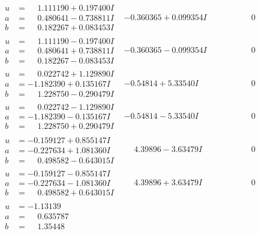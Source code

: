 \documentclass[1p]{elsarticle_modified}
\theoremstyle{definition}
\begin{document}
$$\begin{array}{c|c|c}
\begin{aligned}
u &= \phantom{-}1.111190 + 0.197400 I \\
a &= \phantom{-}0.480641 - 0.738811 I \\
b &= \phantom{-}0.182267 + 0.083453 I\end{aligned}
 & -0.360365 + 0.099354 I & \phantom{-0.000000 } 0 \\ \hline\begin{aligned}
u &= \phantom{-}1.111190 - 0.197400 I \\
a &= \phantom{-}0.480641 + 0.738811 I \\
b &= \phantom{-}0.182267 - 0.083453 I\end{aligned}
 & -0.360365 - 0.099354 I & \phantom{-0.000000 } 0 \\ \hline\begin{aligned}
u &= \phantom{-}0.022742 + 1.129890 I \\
a &= -1.182390 + 0.135167 I \\
b &= \phantom{-}1.228750 - 0.290479 I\end{aligned}
 & -0.54814 + 5.33540 I & \phantom{-0.000000 } 0 \\ \hline\begin{aligned}
u &= \phantom{-}0.022742 - 1.129890 I \\
a &= -1.182390 - 0.135167 I \\
b &= \phantom{-}1.228750 + 0.290479 I\end{aligned}
 & -0.54814 - 5.33540 I & \phantom{-0.000000 } 0 \\ \hline\begin{aligned}
u &= -0.159127 + 0.855147 I \\
a &= -0.227634 + 1.081360 I \\
b &= \phantom{-}0.498582 - 0.643015 I\end{aligned}
 & \phantom{-}4.39896 - 3.63479 I & \phantom{-0.000000 } 0 \\ \hline\begin{aligned}
u &= -0.159127 - 0.855147 I \\
a &= -0.227634 - 1.081360 I \\
b &= \phantom{-}0.498582 + 0.643015 I\end{aligned}
 & \phantom{-}4.39896 + 3.63479 I & \phantom{-0.000000 } 0 \\ \hline\begin{aligned}
u &= -1.13139\phantom{ +0.000000I} \\
a &= \phantom{-}0.635787\phantom{ +0.000000I} \\
b &= \phantom{-}1.35448\phantom{ +0.000000I}\end{aligned}

\end{array}$$
\end{document}
